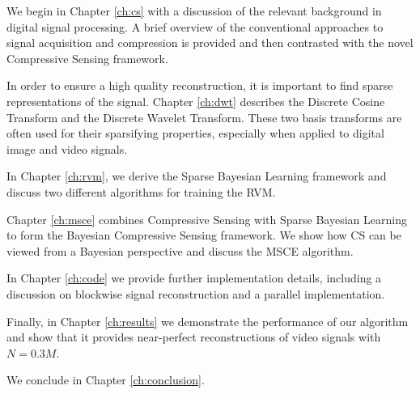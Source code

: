 We begin in Chapter \ref{ch:cs} with a discussion of the relevant background in digital signal processing.
A brief overview of the conventional approaches to signal acquisition and compression is provided and then contrasted with the novel Compressive Sensing framework.

In order to ensure a high quality reconstruction, it is important to find sparse representations of the signal.
Chapter \ref{ch:dwt} describes the Discrete Cosine Transform and the Discrete Wavelet Transform.
These two basis transforms are often used for their sparsifying properties, especially when applied to digital image and video signals.

In Chapter \ref{ch:rvm}, we derive the Sparse Bayesian Learning framework and discuss two different algorithms for training the RVM.

Chapter \ref{ch:msce} combines Compressive Sensing with Sparse Bayesian Learning to form the Bayesian Compressive Sensing framework.
We show how CS can be viewed from a Bayesian perspective and discuss the MSCE algorithm.

In Chapter \ref{ch:code} we provide further implementation details, including a discussion on blockwise signal reconstruction and a parallel implementation.

Finally, in Chapter \ref{ch:results} we demonstrate the performance of our algorithm and show that it provides near-perfect reconstructions of video signals with $N = 0.3M$.

We conclude in Chapter \ref{ch:conclusion}.

